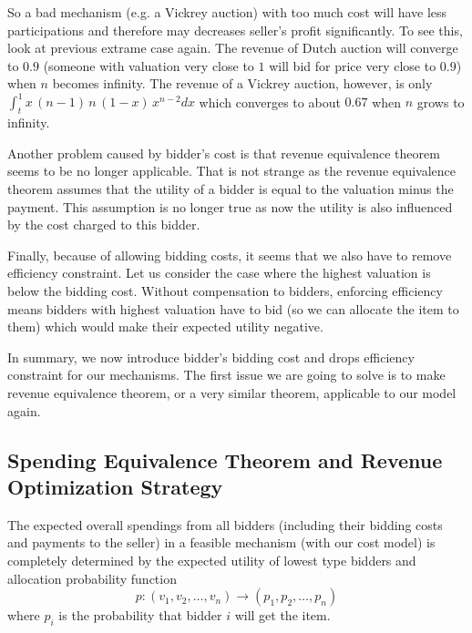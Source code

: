 So a bad mechanism (e.g. a Vickrey auction) with too much cost will have less
participations and therefore may decreases seller's profit significantly.  To see
this, look at previous extrame case again.  The revenue of Dutch auction will
converge to $0.9$ (someone with valuation very close to $1$ will bid for price
very close to $0.9$) when $n$ becomes infinity.  The revenue of a Vickrey
auction, however, is only $\int_t^1 x \, (n-1) \,n\,( 1-x) \,{x}^{n-2} dx$
which converges to about $0.67$ when $n$ grows to infinity.  

Another problem caused by bidder's cost is that revenue equivalence theorem
seems to be no longer applicable. That is not strange as the revenue equivalence
theorem assumes that the utility of a bidder is equal to the valuation minus
the payment. This assumption is no longer true as now the utility is also
influenced by the cost charged to this bidder.

Finally, because of allowing bidding costs, it seems that we also have to remove
efficiency constraint. Let us consider the case where the highest valuation is
below the bidding cost. Without compensation to bidders, enforcing efficiency means
bidders with highest valuation have to bid (so we can allocate the item to
them) which would make their expected utility negative.

In summary, we now introduce bidder's bidding cost and drops efficiency
constraint for our mechanisms. The first issue we are going to solve is to make
revenue equivalence theorem, or a very similar theorem, applicable to our model
again. 

\subsection{Spending Equivalence Theorem and Revenue Optimization Strategy}

\begin{theorem}\label{theorem:equivalence}

The expected overall spendings from all bidders (including their bidding costs
and payments to the seller) in a feasible mechanism (with our cost model) is
completely determined by the expected utility of lowest type bidders and
allocation probability function
$$p: (v_1, v_2, \ldots, v_n) \rightarrow (p_1, p_2, \ldots, p_n)$$ 
where $p_i$ is the probability that bidder $i$ will get the item.

\end{theorem}

